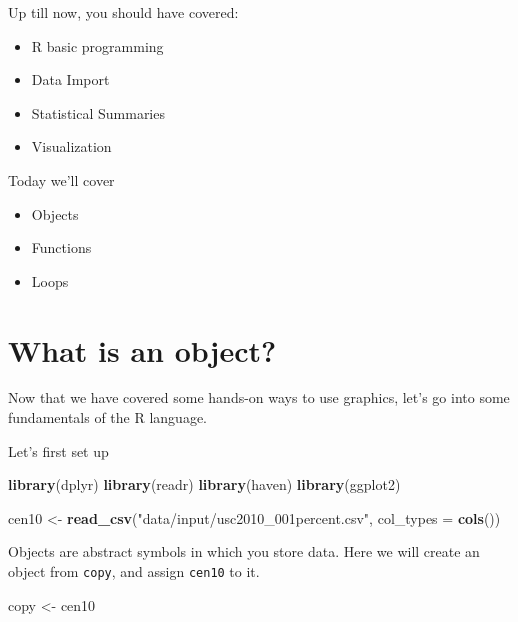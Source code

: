 \documentclass[]{book}
\newenvironment{Shaded}{\begin{snugshade}}{\end{snugshade}}
\newcommand{\DataTypeTok}[1]{\textcolor[rgb]{0.13,0.29,0.53}{#1}}
\newcommand{\KeywordTok}[1]{\textcolor[rgb]{0.13,0.29,0.53}{\textbf{#1}}}
\newcommand{\NormalTok}[1]{#1}
\newcommand{\StringTok}[1]{\textcolor[rgb]{0.31,0.60,0.02}{#1}}
\providecommand{\tightlist}{%
  \setlength{\itemsep}{0pt}\setlength{\parskip}{0pt}}
\theoremstyle{definition}
\theoremstyle{definition}
\theoremstyle{definition}
\theoremstyle{remark}
\begin{document}
Up till now, you should have covered:

\begin{itemize}
\tightlist
\item
  R basic programming
\item
  Data Import
\item
  Statistical Summaries
\item
  Visualization
\end{itemize}

Today we'll cover

\begin{itemize}
\tightlist
\item
  Objects
\item
  Functions
\item
  Loops
\end{itemize}

\hypertarget{what-is-an-object}{%
\section{What is an object?}\label{what-is-an-object}}

Now that we have covered some hands-on ways to use graphics, let's go into some fundamentals of the R language.

Let's first set up

\begin{Shaded}
\begin{Highlighting}[]
\KeywordTok{library}\NormalTok{(dplyr)}
\KeywordTok{library}\NormalTok{(readr)}
\KeywordTok{library}\NormalTok{(haven)}
\KeywordTok{library}\NormalTok{(ggplot2)}
\end{Highlighting}
\end{Shaded}

\begin{Shaded}
\begin{Highlighting}[]
\NormalTok{cen10 <-}\StringTok{ }\KeywordTok{read_csv}\NormalTok{(}\StringTok{"data/input/usc2010_001percent.csv"}\NormalTok{, }\DataTypeTok{col_types =} \KeywordTok{cols}\NormalTok{())}
\end{Highlighting}
\end{Shaded}

Objects are abstract symbols in which you store data. Here we will create an object from \texttt{copy}, and assign \texttt{cen10} to it.

\begin{Shaded}
\begin{Highlighting}[]
\NormalTok{copy <-}\StringTok{ }\NormalTok{cen10 }
\end{Highlighting}
\end{Shaded}
\end{document}
